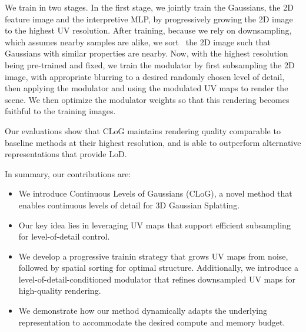   We train \clog in two stages.
  In the first stage, we jointly train the Gaussians, the 2D feature image and
  the interpretive MLP, by progressively growing the 2D image to the highest
  UV resolution.
  After training, because we rely on downsampling, which assumes nearby
  samples are alike, we sort~\cite{morgenstern2024compact} the 2D image such
  that Gaussians with similar properties are nearby.
  Now, with the highest resolution being pre-trained and fixed, we train the
  modulator by first subsampling the 2D image, with appropriate blurring to a
  desired randomly chosen level of detail, then applying the modulator and
  using the modulated UV maps to render the scene.
  We then optimize the modulator weights so that this rendering becomes
  faithful to the training images.

  Our evaluations show that CLoG maintains rendering quality comparable to
  baseline methods at their highest resolution, and is able to outperform
  alternative representations that provide LoD.

  \noindent
  In summary, our contributions are:
  \begin{itemize}
    \item We introduce Continuous Levels of Gaussians (CLoG), a novel method that enables continuous levels of detail for 3D Gaussian Splatting.
    \item Our key idea lies in leveraging UV maps that support efficient subsampling for level-of-detail control.
    \item We develop a progressive trainin strategy that grows UV maps from noise, followed by spatial sorting for optimal structure.
          Additionally, we introduce a level-of-detail-conditioned modulator
          that refines downsampled UV maps for high-quality rendering.
    \item We demonstrate how our method dynamically adapts the underlying representation to accommodate the desired compute and memory budget.
  \end{itemize}
